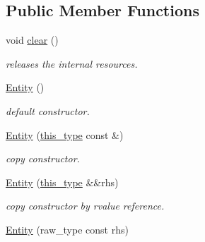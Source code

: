 \subsection*{Public Member Functions}
\begin{DoxyCompactItemize}
\item 
\hypertarget{classhryky_1_1scale_1_1_entity_ae0d0dd27d319afcc138de2c4dd733370}{void \hyperlink{classhryky_1_1scale_1_1_entity_ae0d0dd27d319afcc138de2c4dd733370}{clear} ()}\label{classhryky_1_1scale_1_1_entity_ae0d0dd27d319afcc138de2c4dd733370}

\begin{DoxyCompactList}\small\item\em releases the internal resources. \end{DoxyCompactList}\item 
\hypertarget{classhryky_1_1scale_1_1_entity_aa350dc64a99ba08a1dbc8ac40e18d97e}{\hyperlink{classhryky_1_1scale_1_1_entity_aa350dc64a99ba08a1dbc8ac40e18d97e}{Entity} ()}\label{classhryky_1_1scale_1_1_entity_aa350dc64a99ba08a1dbc8ac40e18d97e}

\begin{DoxyCompactList}\small\item\em default constructor. \end{DoxyCompactList}\item 
\hypertarget{classhryky_1_1scale_1_1_entity_a3200eaffe5613c22fdd61ca962f193a0}{\hyperlink{classhryky_1_1scale_1_1_entity_a3200eaffe5613c22fdd61ca962f193a0}{Entity} (\hyperlink{classhryky_1_1scale_1_1_entity_af312f46dc3d31369144a960d386790c3}{this\-\_\-type} const \&)}\label{classhryky_1_1scale_1_1_entity_a3200eaffe5613c22fdd61ca962f193a0}

\begin{DoxyCompactList}\small\item\em copy constructor. \end{DoxyCompactList}\item 
\hypertarget{classhryky_1_1scale_1_1_entity_ae6d72480f79d0e666036870ccba763a6}{\hyperlink{classhryky_1_1scale_1_1_entity_ae6d72480f79d0e666036870ccba763a6}{Entity} (\hyperlink{classhryky_1_1scale_1_1_entity_af312f46dc3d31369144a960d386790c3}{this\-\_\-type} \&\&rhs)}\label{classhryky_1_1scale_1_1_entity_ae6d72480f79d0e666036870ccba763a6}

\begin{DoxyCompactList}\small\item\em copy constructor by rvalue reference. \end{DoxyCompactList}\item 
\hypertarget{classhryky_1_1scale_1_1_entity_aababe40f5fca9a4e7dc227854039fd06}{\hyperlink{classhryky_1_1scale_1_1_entity_aababe40f5fca9a4e7dc227854039fd06}{Entity} (raw\-\_\-type const rhs)}\label{classhryky_1_1scale_1_1_entity_aababe40f5fca9a4e7dc227854039fd06}


\end{DoxyCompactItemize}
